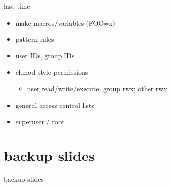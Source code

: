 \date{}
\title{}
\date{}

\begin{frame}
    \titlepage
\end{frame}

\begin{frame}{last time}
    \begin{itemize}
    \item make macros/variables (FOO=x)
    \item pattern rules
    \vspace{.5cm}
    \item user IDs, group IDs
    \item chmod-style permissions
        \begin{itemize}
        \item user read/write/execute; group rwx; other rwx
        \end{itemize}
    \item general access control lists
    \item superuser / root
    \end{itemize}
\end{frame}






\section{backup slides}
\begin{frame}{backup slides}
\end{frame}


